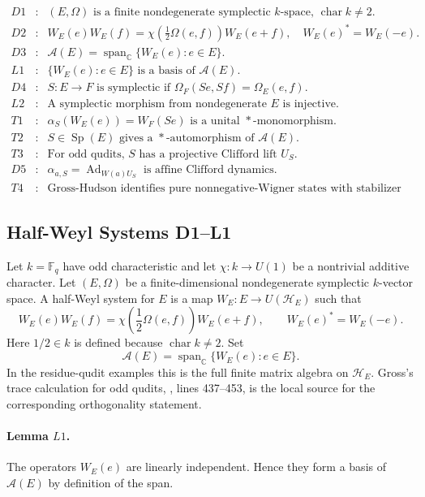 \[
\begin{array}{rcl}
D1&:&(E,\Omega)\text{ is a finite nondegenerate symplectic }k\text{-space,
      }\operatorname{char}k\ne2.\\
D2&:&W_E(e)W_E(f)=\chi(\frac12\Omega(e,f))W_E(e+f),\quad
      W_E(e)^*=W_E(-e).\\
D3&:&\mathcal A(E)=\operatorname{span}_{\mathbb C}\{W_E(e):e\in E\}.\\
L1&:&\{W_E(e):e\in E\}\text{ is a basis of }\mathcal A(E).\\
D4&:&S:E\to F\text{ is symplectic if }\Omega_F(Se,Sf)=\Omega_E(e,f).\\
L2&:&\text{A symplectic morphism from nondegenerate }E\text{ is injective}.\\
T1&:&\alpha_S(W_E(e))=W_F(Se)\text{ is a unital }*\text{-monomorphism}.\\
T2&:&S\in\operatorname{Sp}(E)\text{ gives a }*\text{-automorphism of }
      \mathcal A(E).\\
T3&:&\text{For odd qudits, }S\text{ has a projective Clifford lift }U_S.\\
D5&:&\alpha_{a,S}=\operatorname{Ad}_{W(a)U_S}\text{ is affine Clifford
      dynamics}.\\
T4&:&\text{Gross-Hudson identifies pure nonnegative-Wigner states with
      stabilizer states.}
\end{array}
\]

\subsection{Half-Weyl Systems D1--L1}

Let \(k=\mathbb F_q\) have odd characteristic and let
\(\chi:k\to U(1)\) be a nontrivial additive character.  Let
\((E,\Omega)\) be a finite-dimensional nondegenerate symplectic \(k\)-vector
space.  A half-Weyl system for \(E\) is a map \(W_E:E\to U(\mathcal H_E)\)
such that
\[
  W_E(e)W_E(f)=\chi\!\left(\frac12\Omega(e,f)\right)W_E(e+f),
  \qquad
  W_E(e)^*=W_E(-e).
\]
Here \(1/2\in k\) is defined because \(\operatorname{char}k\ne2\).
Set
\[
  \mathcal A(E)=\operatorname{span}_{\mathbb C}\{W_E(e):e\in E\}.
\]
In the residue-qudit examples this is the full finite matrix algebra on
\(\mathcal H_E\).  Gross's trace calculation for odd qudits,
, lines 437--453, is the local source for the corresponding
orthogonality statement.

\paragraph{Lemma \(L1\).}
The operators \(W_E(e)\) are linearly independent.  Hence they form a basis of
\(\mathcal A(E)\) by definition of the span.

